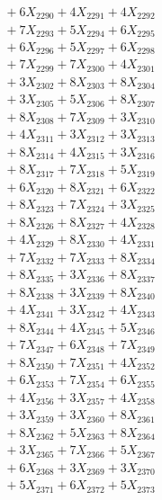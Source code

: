 \documentclass[a4paper,10pt]{article}
\begin{document}
{\begin{align}
&\;  + 6 X_{2290} + 4 X_{2291} + 4 X_{2292} \\[0.3ex]
&\;  + 7 X_{2293} + 5 X_{2294} + 6 X_{2295} \\[0.3ex]
&\;  + 6 X_{2296} + 5 X_{2297} + 6 X_{2298} \\[0.3ex]
&\;  + 7 X_{2299} + 7 X_{2300} + 4 X_{2301} \\[0.3ex]
&\;  + 3 X_{2302} + 8 X_{2303} + 8 X_{2304} \\[0.3ex]
&\;  + 3 X_{2305} + 5 X_{2306} + 8 X_{2307} \\[0.3ex]
&\;  + 8 X_{2308} + 7 X_{2309} + 3 X_{2310} \\[0.3ex]
&\;  + 4 X_{2311} + 3 X_{2312} + 3 X_{2313} \\[0.3ex]
&\;  + 8 X_{2314} + 4 X_{2315} + 3 X_{2316} \\[0.3ex]
&\;  + 8 X_{2317} + 7 X_{2318} + 5 X_{2319} \\[0.5ex]\allowbreak
&\;  + 6 X_{2320} + 8 X_{2321} + 6 X_{2322} \\[0.3ex]
&\;  + 8 X_{2323} + 7 X_{2324} + 3 X_{2325} \\[0.3ex]
&\;  + 8 X_{2326} + 8 X_{2327} + 4 X_{2328} \\[0.3ex]
&\;  + 4 X_{2329} + 8 X_{2330} + 4 X_{2331} \\[0.3ex]
&\;  + 7 X_{2332} + 7 X_{2333} + 8 X_{2334} \\[0.3ex]
&\;  + 8 X_{2335} + 3 X_{2336} + 8 X_{2337} \\[0.3ex]
&\;  + 8 X_{2338} + 3 X_{2339} + 8 X_{2340} \\[0.3ex]
&\;  + 4 X_{2341} + 3 X_{2342} + 4 X_{2343} \\[0.3ex]
&\;  + 8 X_{2344} + 4 X_{2345} + 5 X_{2346} \\[0.3ex]
&\;  + 7 X_{2347} + 6 X_{2348} + 7 X_{2349} \\[0.5ex]\allowbreak
&\;  + 8 X_{2350} + 7 X_{2351} + 4 X_{2352} \\[0.3ex]
&\;  + 6 X_{2353} + 7 X_{2354} + 6 X_{2355} \\[0.3ex]
&\;  + 4 X_{2356} + 3 X_{2357} + 4 X_{2358} \\[0.3ex]
&\;  + 3 X_{2359} + 3 X_{2360} + 8 X_{2361} \\[0.3ex]
&\;  + 8 X_{2362} + 5 X_{2363} + 8 X_{2364} \\[0.3ex]
&\;  + 3 X_{2365} + 7 X_{2366} + 5 X_{2367} \\[0.3ex]
&\;  + 6 X_{2368} + 3 X_{2369} + 3 X_{2370} \\[0.3ex]
&\;  + 5 X_{2371} + 6 X_{2372} + 5 X_{2373} \\[0.3ex]

\end{align}}
\end{document}
